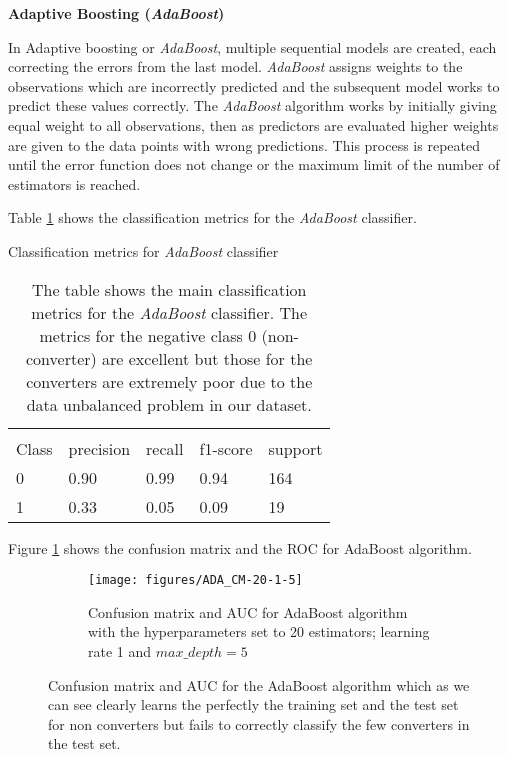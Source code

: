 \documentclass[11pt]{article}
\theoremstyle{definition}
\theoremstyle{remark}
\begin{document}
\textbf{Adaptive Boosting (\emph{AdaBoost})}

In Adaptive boosting or \emph{AdaBoost}, multiple sequential models are created, each correcting the errors from the last model. \emph{AdaBoost} assigns weights to the observations which are incorrectly predicted and the subsequent model works to predict these values correctly. The \emph{AdaBoost} algorithm works by initially giving equal weight to all observations, then as predictors are evaluated higher weights are given to the data points with wrong predictions. This process is repeated until the error function does not change or the maximum limit of the number of estimators is reached.

Table \ref{tab:ada} shows the classification metrics for the \emph{AdaBoost} classifier.
\begin{table}[H]
\caption{Classification metrics for \emph{AdaBoost} classifier} 
\begin{center} 
\begin{tabular}{lllll}
\hline
\multicolumn{1}{c}{} \\
Class & precision & recall & f1-score & support     \\
\hline
0 & 0.90  &    0.99   &   0.94   &    164 \\
1 & 0.33  &    0.05   &   0.09   &    19 \\
\hline
\end{tabular}
\caption{The table shows the main classification metrics for the \emph{AdaBoost} classifier. The metrics for the negative class 0 (non-converter) are excellent but those for the converters are extremely poor due to the data unbalanced problem in our dataset.
} \label{tab:ada} 
\end{center}
\end{table}

Figure \ref{fig:rf_ada} shows the confusion matrix and the ROC for AdaBoost algorithm. 
\begin{figure}[H]
    \centering
    \begin{subfigure}[t]{.8\textwidth}
        \centering
        \texttt{[image: figures/ADA\_CM-20-1-5]}
        \caption{Confusion matrix and AUC for AdaBoost algorithm with the hyperparameters set to 20 estimators; learning rate 1 and  $max\_depth=5$}
    \end{subfigure}

    
    \caption{Confusion matrix and AUC for the AdaBoost algorithm which as we can see clearly learns the perfectly the training set and the test set for non converters but fails to correctly classify the few converters in the test set. } \label{fig:rf_ada}
\end{figure}
\end{document}
